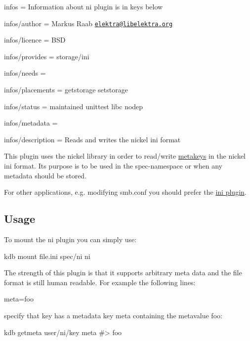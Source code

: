 
\begin{DoxyItemize}
\item infos = Information about ni plugin is in keys below
\item infos/author = Markus Raab \href{mailto:elektra@libelektra.org}{\tt elektra@libelektra.\+org}
\item infos/licence = B\+SD
\item infos/provides = storage/ini
\item infos/needs =
\item infos/placements = getstorage setstorage
\item infos/status = maintained unittest libc nodep
\item infos/metadata =
\item infos/description = Reads and writes the nickel ini format
\end{DoxyItemize}

This plugin uses the nickel library in order to read/write \hyperlink{doc_help_elektra-metadata_md}{metakeys} in the nickel ini format. It\textquotesingle{}s purpose is to be used in the {\ttfamily spec}-\/namespace or when any metadata should be stored.

For other applications, e.\+g. modifying {\ttfamily smb.\+conf} you should prefer the \hyperlink{md_src_plugins_ini_README_src_plugins_ini_README_md}{ini plugin}.

\subsection*{Usage}

To mount the ni plugin you can simply use\+:


\begin{DoxyCode}
kdb mount file.ini spec/ni ni
\end{DoxyCode}


The strength of this plugin is that it supports arbitrary meta data and the file format is still human readable. For example the following lines\+:


\begin{DoxyCode}
[key]
meta=foo
\end{DoxyCode}


specify that {\ttfamily key} has a metadata key {\ttfamily meta} containing the metavalue {\ttfamily foo}\+:


\begin{DoxyCode}
kdb getmeta user/ni/key meta
#> foo
\end{DoxyCode}


